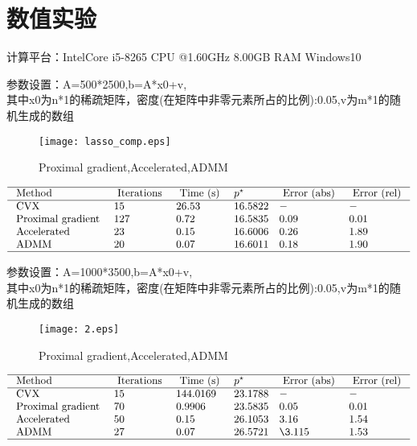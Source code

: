 \documentclass[cn,11pt,chinese,black]{elegantbook}
\begin{document}
\section{数值实验}
\noindent 计算平台：IntelCore i5-8265 CPU @1.60GHz  8.00GB RAM Windows10 \\
\begin{example}
	参数设置：A=500*2500,b=A*x0+v,\\ 其中x0为n*1的稀疏矩阵，密度(在矩阵中非零元素所占的比例):0.05,v为m*1的随机生成的数组
\end{example}
 \begin{figure}[H]
	\centering
	\texttt{[image: lasso\_comp.eps]}
	\caption{Proximal gradient,Accelerated,ADMM}
\end{figure}

$$\begin{array}{llllll}
\hline \text { Method } & \text { Iterations } & \text { Time (s) } & p^{\star} & \text { Error (abs) } & \text { Error (rel) } \\
\hline \text { CVX } & 15 & 26.53 & 16.5822 & - & - \\
\text { Proximal gradient } & 127 & 0.72 & 16.5835 & 0.09 & 0.01 \\
\text { Accelerated } & 23 & 0.15 & 16.6006 & 0.26 & 1.89 \\
\text { ADMM } & 20 & 0.07 & 16.6011 & 0.18 & 1.90 \\
\hline
\end{array}$$
\begin{example}
	参数设置：A=1000*3500,b=A*x0+v,\\ 其中x0为n*1的稀疏矩阵，密度(在矩阵中非零元素所占的比例):0.05,v为m*1的随机生成的数组
\end{example}
 \begin{figure}[H]
	\centering
	\texttt{[image: 2.eps]}
	\caption{Proximal gradient,Accelerated,ADMM}
\end{figure}
 $$\begin{array}{llllll}
\hline \text { Method } & \text { Iterations } & \text { Time (s) } & p^{\star} & \text { Error (abs) } & \text { Error (rel) } \\
\hline \text { CVX } & 15 & 144.0169 & 23.1788 & - & - \\
\text { Proximal gradient } & 70 & 0.9906 & 23.5835 & 0.05 & 0.01 \\
\text { Accelerated } & 50 & 0.15 &  26.1053 & 3.16 & 1.54 \\
\text { ADMM } & 27 & 0.07 & 26.5721 & \3.115 & 1.53 \\
\hline
\end{array}$$
\end{document}
